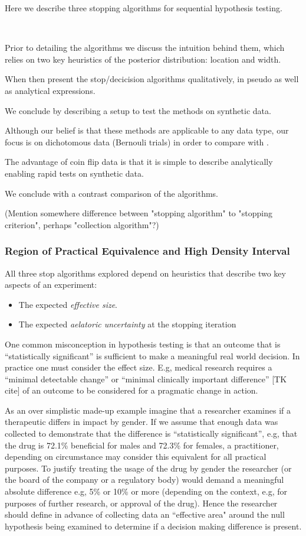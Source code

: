 Here we describe three stopping algorithms for sequential hypothesis testing.

\
\

Prior to detailing the algorithms we discuss the intuition behind them,
which relies on two key heuristics of the posterior distribution: location and width.

When then present the stop/decicision algorithms qualitatively, in pseudo as well as analytical expressions.

We conclude by describing a setup
to test the methods on synthetic data.

Although our belief is that these methods are applicable to any data type,
our focus is on dichotomous data (Bernouli trials)
in order to compare with \cite{kruschke2015doing}.

The advantage of coin flip data is that it is simple to describe analytically
enabling rapid tests on synthetic data.


We conclude with a contrast comparison of the algorithms.

(Mention somewhere difference between "stopping algorithm" to "stopping criterion",
perhaps "collection algorithm"?)


\subsubsection{Region of Practical Equivalence and High Density Interval}
All three stop algorithms explored depend on heuristics that describe two key
aspects of an experiment:
\begin{itemize}
    \item The expected {\it effective size}.
    \item The expected {\it aelatoric uncertainty} at the stopping iteration
\end{itemize}


One common misconception in hypothesis testing is that an outcome that is
“statistically significant” is sufficient to make a meaningful real world decision.
In practice one must consider the effect size.
E.g, medical research requires a “minimal detectable change” or
“minimal clinically important difference” [TK cite] of an outcome to be
considered for a pragmatic change in action.

As an over simplistic made-up example imagine that a researcher examines if a
therapeutic differs in impact by gender.
If we assume that enough data was collected to demonstrate that the difference is
“statistically significant”, e.g, that the drug is 72.1\% beneficial for males
and 72.3\% for females, a practitioner, depending on circumstance may consider
this equivalent for all practical purposes.
To justify treating the usage of the drug by gender the
researcher (or the board of the company or a regulatory body) would demand
a meaningful absolute difference e.g,  5\% or 10\% or more
(depending on the context, e.g, for purposes of further research, or approval
of the drug). Hence the researcher should define in advance of collecting data an
“effective area" around the null hypothesis being examined to determine if a
decision making difference is present.

